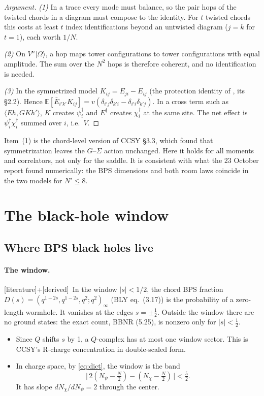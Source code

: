 \documentclass[11pt]{article}
\newcommand{\Np}{N'}
\newcommand{\ip}[2]{\langle #1,#2\rangle}
\newcommand{\Om}{|\Omega\rangle}
\newcommand{\tagbox}[2]{\textsf{\small\color{#1}[#2]}}
\newcommand{\EST}{\tagbox{cest}{literature}}
\newcommand{\DER}{\tagbox{cder}{derived}}
\theoremstyle{plain}
\theoremstyle{remark}
\numberwithin{equation}{section}
\begin{document}
\begin{proof}[Argument]
\emph{(1)} In a trace every mode must balance, so the pair hops of the twisted chords in a diagram must compose to the
identity. For $t$ twisted chords this costs at least $t$ index identifications beyond an untwisted diagram ($j=k$ for
$t=1$), each worth $1/N$.

\emph{(2)} On $V^n\Om$, a hop maps tower configurations to tower configurations with equal amplitude. The sum over the
$N^2$ hops is therefore coherent, and no identification is needed.

\emph{(3)} In the symmetrized model $K_{ij}=E_{ji}-E_{ij}$ (the protection identity of \cite{prog1023}, its \S2.2). Hence
$\mathbb E[\bar E_{i'k'}K_{ij}]=v(\delta_{i'j}\delta_{k'i}-\delta_{i'i}\delta_{k'j})$. In a cross term such as
$\ip{E h}{G K h'}$, $K$ creates $\psi_i^\dagger$ and $E^\dagger$ creates $\chi_i^\dagger$ at the same site. The net effect is
$\psi_i^\dagger\chi_i^\dagger$ summed over $i$, i.e.\ $V$.
\end{proof}

Item~(1) is the chord-level version of CCSY \S3.3, which found that symmetrization leaves the $G$--$\Sigma$ action
unchanged. Here it holds for all moments and correlators, not only for the saddle. It is consistent with what the 23
October report found numerically: the BPS dimensions and both room laws coincide in the two models for $\Np\le8$.

\section{The black-hole window}\label{sec:window}

\subsection{Where BPS black holes live}

\paragraph{The window.} \EST+\DER\ In the window $|s|<1/2$, the chord BPS fraction
$D(s)=(q^{1+2s},q^{1-2s},q^2;q^2)_\infty$ (BLY \cite{BLY} eq.~(3.17)) is the probability of a zero-length wormhole. It
vanishes at the edges $s=\pm\tfrac12$. Outside the window there are no ground states: the exact count, BBNR (5.25), is
nonzero only for $|s|<\tfrac12$.
\begin{itemize}\itemsep1pt
\item Since $Q$ shifts $s$ by 1, a $Q$-complex has at most one window sector. This is CCSY's R-charge concentration in
  double-scaled form.
\item In charge space, by \eqref{eq:dict}, the window is the band
  \begin{equation}\label{eq:band}
  \big|\,2(N_\psi-\tfrac N2)-(N_\chi-\tfrac N2)\,\big|<\tfrac52 .
  \end{equation}
  It has slope $dN_\chi/dN_\psi=2$ through the center.
\end{itemize}
\end{document}
